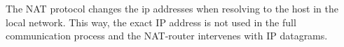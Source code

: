 The NAT protocol changes the ip addresses when resolving to the host in the local network.
This way, the exact IP address is not used in the full communication process and the NAT-router intervenes with IP datagrams.
